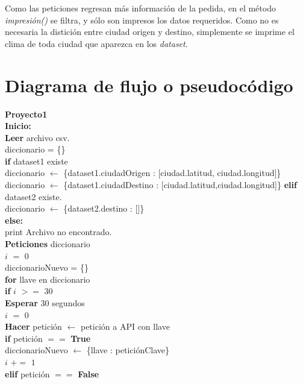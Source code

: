 \documentclass[]{article}
\begin{document}
Como las peticiones regresan más información de la pedida, en el método
\emph{impresión()} se filtra, y sólo son impresos los datos requeridos. Como
no es necesaria la distición entre ciudad origen y destino, simplemente se
imprime el clima de toda ciudad que aparezca en los \emph{dataset}.

\section{Diagrama de flujo o pseudocódigo}
\textbf{Proyecto1}\\
\textbf{Inicio:}\\
\indent \textbf{Leer} archivo csv.\\
\indent\indent diccionario = \{\}\\
\indent\indent \textbf{if} dataset1 existe\\
\indent\indent\indent diccionario $ \leftarrow $ \{dataset1.ciudadOrigen :
[ciudad.latitud, ciudad.longitud]\} \\
\indent\indent\indent diccionario $ \leftarrow $ \{dataset1.ciudadDestino :
[ciudad.latitud,ciudad.longitud]\}
\indent\indent \textbf{elif} dataset2 existe.\\
\indent\indent\indent diccionario $ \leftarrow $ \{dataset2.destino : []\}\\
\indent\indent \textbf{else:}\\
\indent\indent\indent print Archivo no encontrado.\\
\indent \textbf{Peticiones} diccionario\\
\indent\indent $ i $ $ = $ $ 0 $\\
\indent\indent diccionarioNuevo = \{\} \\
\indent\indent \textbf{for} llave en diccionario\\
\indent\indent\indent \textbf{if} $ i $ $ >= $ $ 30 $\\
\indent\indent\indent\indent \textbf{Esperar} 30 segundos\\
\indent\indent\indent\indent $ i $ $ = $ $ 0 $\\
\indent\indent\indent \textbf{Hacer} petición $ \leftarrow $ petición a API
con llave\\
\indent\indent\indent \textbf{if} petición $ == $ \textbf{True}\\
\indent\indent\indent\indent diccionarioNuevo $ \leftarrow $ \{llave :
peticiónClave\}\\
\indent\indent\indent\indent $ i $ $ += $ $ 1 $\\
\indent\indent\indent \textbf{elif} petición $ == $ \textbf{False}\\
\end{document}
